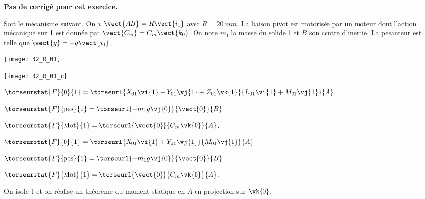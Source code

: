 \normaltrue
\correctiontrue


\setcounter{numques}{0}
\ifcorrection
\else
\textbf{Pas de corrigé pour cet exercice.}
\fi

\ifprof
\else
Soit le mécanisme suivant. On a $\vect{AB}=R\vect{i_1}$ avec $R=\SI{20}{mm}$. La liaison pivot est motorisée par un moteur dont l'action mécanique sur \textbf{1} est donnée par $\vect{C_m}=C_m \vect{k_0}$.
On note $m_1$ la masse du solide 1 et $B$ son centre d'inertie. 
 La pesanteur est telle que $\vect{g}=-g\vect{j_0}$.

\begin{center}
\texttt{[image: 02\_R\_01]}
\end{center}
\fi

\ifprof
\begin{center}
\texttt{[image: 02\_R\_01\_c]}
\end{center}
\else
\fi

\ifprof
$\torseurstat{F}{0}{1}=\torseurl{X_{01}\vi{1}+Y_{01}\vj{1}+Z_{01}\vk{1}}{L_{01}\vi{1}+M_{01}\vj{1}}{A}$

$\torseurstat{F}{\text{pes}}{1}=\torseurl{-m_1g\vj{0}}{\vect{0}}{B}$

$\torseurstat{F}{\text{Mot}}{1}=\torseurl{\vect{0}}{C_m\vk{0}}{A}$.
\else
\fi


\ifprof
$\torseurstat{F}{0}{1}=\torseurl{X_{01}\vi{1}+Y_{01}\vj{1}}{M_{01}\vj{1}}{A}$

$\torseurstat{F}{\text{pes}}{1}=\torseurl{-m_1g\vj{0}}{\vect{0}}{B}$

$\torseurstat{F}{\text{Mot}}{1}=\torseurl{\vect{0}}{C_m\vk{0}}{A}$.
\else
\fi

\ifprof
On isole 1 et on réalise un théorème du moment statique en $A$ en projection sur $\vk{0}$.
\else
\fi



